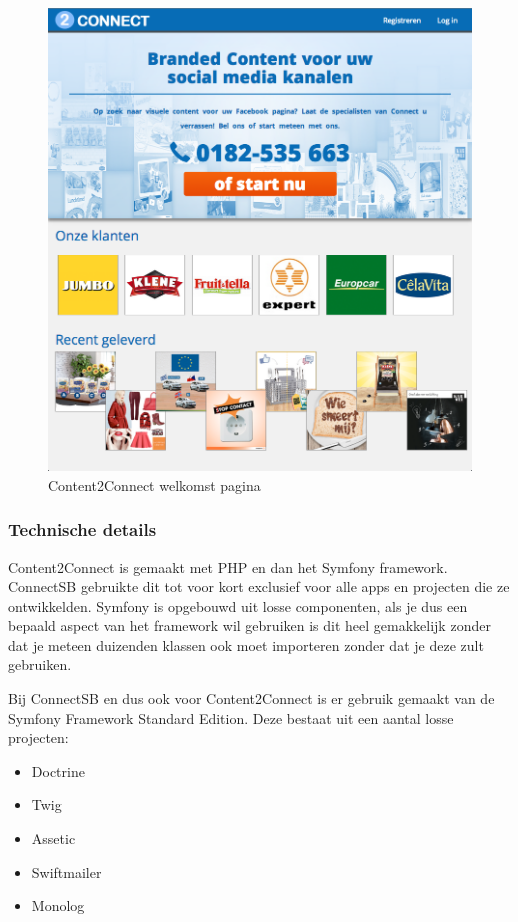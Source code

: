 \begin{minipage}{0.60\textwidth}
\begin{figure}[H]
\includegraphics[width=\textwidth,keepaspectratio]{attachments/Content2Connect-home}
\caption{\label{fig:content2connect-home} Content2Connect welkomst pagina}
\end{figure}
\end{minipage} \hfill

\subsubsection{Technische details}
Content2Connect is gemaakt met PHP en dan het Symfony framework. ConnectSB gebruikte dit tot voor kort exclusief voor alle apps en projecten die ze ontwikkelden. Symfony is opgebouwd uit losse componenten, als je dus een bepaald aspect van het framework wil gebruiken is dit heel gemakkelijk zonder dat je meteen duizenden klassen ook moet importeren zonder dat je deze zult gebruiken.

Bij ConnectSB en dus ook voor Content2Connect is er gebruik gemaakt van de Symfony Framework Standard Edition. Deze bestaat uit een aantal losse projecten:
\begin{itemize}
\item Doctrine
\item Twig
\item Assetic
\item Swiftmailer
\item Monolog
\end{itemize}

